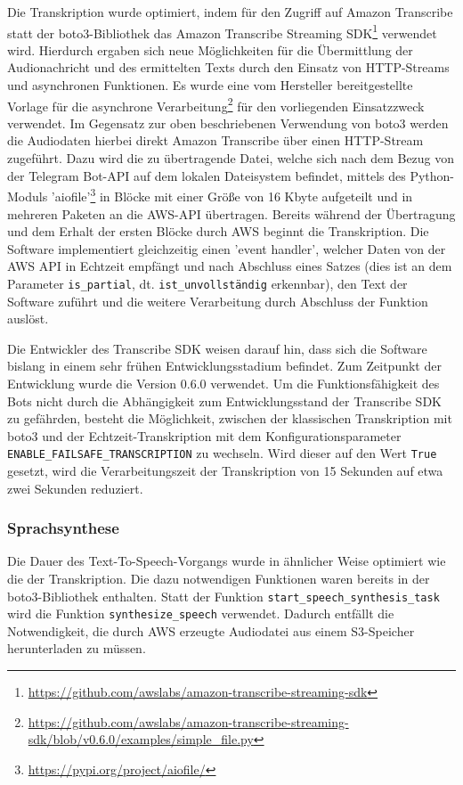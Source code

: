 Die Transkription wurde optimiert, indem für den Zugriff auf Amazon Transcribe statt der boto3-Bibliothek das Amazon Transcribe Streaming SDK\footnote{\url{https://github.com/awslabs/amazon-transcribe-streaming-sdk}} verwendet wird. Hierdurch ergaben sich neue Möglichkeiten für die Übermittlung der Audionachricht und des ermittelten Texts durch den Einsatz von HTTP-Streams und asynchronen Funktionen. Es wurde eine vom Hersteller bereitgestellte Vorlage für die asynchrone Verarbeitung\footnote{\url{https://github.com/awslabs/amazon-transcribe-streaming-sdk/blob/v0.6.0/examples/simple\_file.py}} für den vorliegenden Einsatzzweck verwendet. Im Gegensatz zur oben beschriebenen Verwendung von boto3 werden die Audiodaten hierbei direkt Amazon Transcribe über einen HTTP-Stream zugeführt. Dazu wird die zu übertragende Datei, welche sich nach dem Bezug von der Telegram Bot-API auf dem lokalen Dateisystem befindet, mittels des Python-Moduls 'aiofile'\footnote{\url{https://pypi.org/project/aiofile/}} in Blöcke mit einer Größe von 16 Kbyte aufgeteilt und in mehreren Paketen an die AWS-API übertragen. Bereits während der Übertragung und dem Erhalt der ersten Blöcke durch AWS beginnt die Transkription. Die Software implementiert gleichzeitig einen 'event handler', welcher Daten von der AWS API in Echtzeit empfängt und nach Abschluss eines Satzes (dies ist an dem Parameter \lstinline{is_partial}, dt. \lstinline{ist_unvollständig} erkennbar), den Text der Software zuführt und die weitere Verarbeitung durch Abschluss der Funktion auslöst.

Die Entwickler des Transcribe SDK weisen darauf hin, dass sich die Software bislang in einem sehr frühen Entwicklungsstadium befindet. Zum Zeitpunkt der Entwicklung wurde die Version 0.6.0 verwendet. Um die Funktionsfähigkeit des Bots nicht durch die Abhängigkeit zum Entwicklungsstand der Transcribe SDK zu gefährden, besteht die Möglichkeit, zwischen der klassischen Transkription mit boto3 und der Echtzeit-Transkription mit dem Konfigurationsparameter \lstinline{ENABLE_FAILSAFE_TRANSCRIPTION} zu wechseln. Wird dieser auf den Wert \lstinline{True} gesetzt, wird die Verarbeitungszeit der Transkription von 15 Sekunden auf etwa zwei Sekunden reduziert.

\subsubsection{Sprachsynthese}
\label{sec:optimierung-synth}

Die Dauer des Text-To-Speech-Vorgangs wurde in ähnlicher Weise optimiert wie die der Transkription. Die dazu notwendigen Funktionen waren bereits in der boto3-Bibliothek enthalten. Statt der Funktion \lstinline{start_speech_synthesis_task} wird die Funktion \lstinline{synthesize_speech} verwendet. Dadurch entfällt die Notwendigkeit, die durch AWS erzeugte Audiodatei aus einem S3-Speicher herunterladen zu müssen. 

